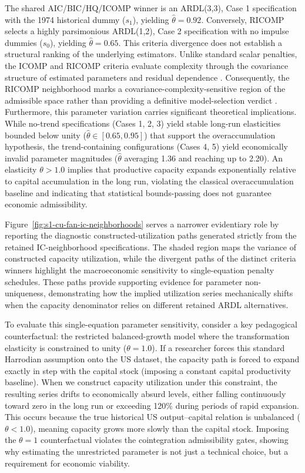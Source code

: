 \documentclass[11pt]{article}
\begin{document}
The shared AIC/BIC/HQ/ICOMP winner is an ARDL(3,3), Case 1 specification with the 1974 historical dummy (\(s_1\)), yielding \(\hat{\theta}=0.92\). Conversely, RICOMP selects a highly parsimonious ARDL(1,2), Case 2 specification with no impulse dummies (\(s_0\)), yielding \(\hat{\theta}=0.65\). This criteria divergence does not establish a structural ranking of the underlying estimators. Unlike standard scalar penalties, the ICOMP and RICOMP criteria evaluate complexity through the covariance structure of estimated parameters and residual dependence \citep{Bozdogan1990,Bozdogan2000}. Consequently, the RICOMP neighborhood marks a covariance-complexity-sensitive region of the admissible space rather than providing a definitive model-selection verdict \citep{GuneyBozdoganArslan2021}. Furthermore, this parameter variation carries significant theoretical implications. While no-trend specifications (Cases 1, 2, 3) yield stable long-run elasticities bounded below unity ($\hat{\theta} \in [0.65, 0.95]$) that support the overaccumulation hypothesis, the trend-containing configurations (Cases 4, 5) yield economically invalid parameter magnitudes ($\hat{\theta}$ averaging 1.36 and reaching up to 2.20). An elasticity $\theta > 1.0$ implies that productive capacity expands exponentially relative to capital accumulation in the long run, violating the classical overaccumulation baseline and indicating that statistical bounds-passing does not guarantee economic admissibility.

Figure~\ref{fig:s1-cu-fan-ic-neighborhoods} serves a narrower evidentiary role by reporting the diagnostic constructed-utilization paths generated strictly from the retained IC-neighborhood specifications. The shaded region maps the variance of constructed capacity utilization, while the divergent paths of the distinct criteria winners highlight the macroeconomic sensitivity to single-equation penalty schedules. These paths provide supporting evidence for parameter non-uniqueness, demonstrating how the implied utilization series mechanically shifts when the capacity denominator relies on different retained ARDL alternatives.

To evaluate this single-equation parameter sensitivity, consider a key pedagogical counterfactual: the restricted balanced-growth model where the transformation elasticity is constrained to unity ($\theta = 1.0$). If a researcher forces this standard Harrodian assumption onto the US dataset, the capacity path is forced to expand exactly in step with the capital stock (imposing a constant capital productivity baseline). When we construct capacity utilization under this constraint, the resulting series drifts to economically absurd levels, either falling continuously toward zero in the long run or exceeding 120\% during periods of rapid expansion. This occurs because the true historical US output--capital relation is unbalanced ($\theta < 1.0$), meaning capacity grows more slowly than the capital stock. Imposing the $\theta=1$ counterfactual violates the cointegration admissibility gates, showing why estimating the unrestricted parameter is not just a technical choice, but a requirement for economic viability.
\end{document}
